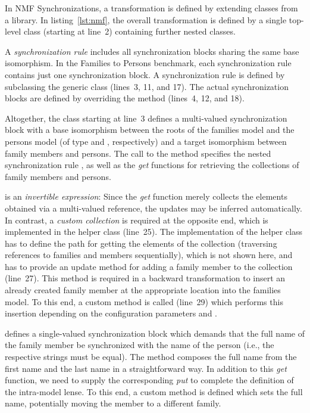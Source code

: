 In NMF Synchronizations, a transformation is defined by extending classes from a library. In listing~\ref{lst:nmf}, the overall transformation is defined by a single top-level class (starting at line~2) containing further nested classes.

A \emph{synchronization rule} includes all synchronization blocks sharing the same base isomorphism. In the Families to Persons benchmark, each synchronization rule contains just one synchronization block. A synchronization rule is defined by subclassing the generic class  (lines~3, 11, and 17). The actual synchronization blocks are defined by overriding the method  (lines~4, 12, and 18). 

Altogether, the class starting at line~3 defines a multi-valued synchronization block with a base isomorphism between the roots of the families model and the persons model (of type  and , respectively) and a target isomorphism between family members and persons. The call to the method  specifies the nested synchronization rule , as well as the \emph{get} functions for retrieving the collections of family members and persons. 

 is an \emph{invertible expression}: Since the \emph{get} function merely collects the elements obtained via a multi-valued reference, the updates may be inferred automatically. In contrast, a \emph{custom collection} is required at the opposite end, which is implemented in the helper class  (line~25). The implementation of the helper class has to define the path for getting the elements of the collection (traversing references to families and members sequentially), which is not shown here, and has to provide an update method for adding a family member to the collection (line~27). This  method is required in a backward transformation to insert an already created family member at the appropriate location into the families model. To this end, a custom method  is called (line~29) which performs this insertion depending on the configuration parameters  and . 

 defines a single-valued synchronization block which demands that the full name of the family member be synchronized with the name of the person (i.e., the respective strings must be equal). The method  composes the full name from the first name and the last name in a straightforward way. In addition to this \emph{get} function, we need to supply the corresponding \emph{put} to complete the definition of the intra-model lense. To this end, a custom method  is defined which sets the full name, potentially moving the member to a different family.

